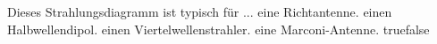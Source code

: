     {Dieses Strahlungsdiagramm ist typisch für ...}
    {eine Richtantenne.}
    {einen Halbwellendipol.}
    {einen Viertelwellenstrahler.}
    {eine Marconi-Antenne.}
    {true}{false}